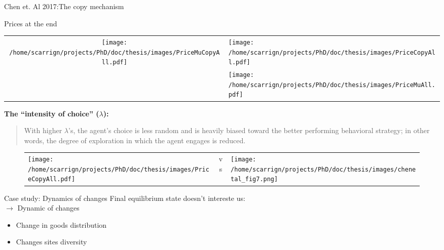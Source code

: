 \documentclass[12pt, notes=show]{beamer}
\begin{document}
\begin{frame}{Chen et. Al 2017:The copy mechanism}
    \begin{table}
    \centering
     \tiny Prices at the end
	\begin{tabular}{c m{2.5cm}}
	   \multirow{2}{2.5cm}{\texttt{[image: /home/scarrign/projects/PhD/doc/thesis/images/PriceMuCopyAll.pdf]}} &
	   \vspace{1cm}\texttt{[image: /home/scarrign/projects/PhD/doc/thesis/images/PriceCopyAll.pdf]}\\
	    & \texttt{[image: /home/scarrign/projects/PhD/doc/thesis/images/PriceMuAll.pdf]} \\
	\end{tabular}
    \end{table}

    \tiny
    \textbf{ The ``intensity of choice'' ($\lambda$):}
    \begin{quote}
	\tiny
	 With higher $\lambda$'s, the agent’s choice is less random and is heavily
	 biased toward the better performing behavioral strategy; in other words, the degree of
	 exploration in which the agent engages is reduced. 
    \end{quote}
    \begin{figure}[htp]
	\begin{center}
	\begin{tabular}{m{4cm}cm{4cm}}
	   \texttt{[image: /home/scarrign/projects/PhD/doc/thesis/images/PriceCopyAll.pdf]} & vs  &
	     \texttt{[image: /home/scarrign/projects/PhD/doc/thesis/images/chenetal\_fig7.png]} \\
	     \end{tabular}
	\end{center}
    \end{figure}
\end{frame}
\begin{frame}{Case study: Dynamics of changes}
    Final equilibrium state doesn't intereste us:\\

    {\centering $\rightarrow$ Dynamic of changes}

   
    \begin{itemize}
	\item Change in goods distribution
	\item Changes sites diversity
    \end{itemize}
    
\end{frame}
\end{document}
